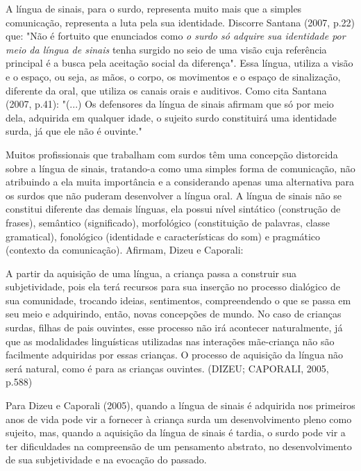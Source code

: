 \documentclass[brasil]{abnt}
\begin{document}
		A língua de sinais, para o surdo, representa muito mais que a 
		simples comunicação, representa a luta pela sua identidade. 
		Discorre Santana (2007, p.22) que: "Não é fortuito que enunciados como 
		\textit{o surdo só adquire sua identidade por meio da língua de sinais} tenha surgido no seio de uma visão cuja referência principal é a busca pela aceitação social da diferença". Essa língua, 
		utiliza a visão e o espaço, ou seja, as mãos, o corpo, os 
		movimentos e o espaço de sinalização, diferente da oral, que 
		utiliza os canais orais e auditivos. Como cita Santana (2007, 
		p.41): "(...) Os 
		defensores da língua de sinais afirmam que só por meio dela, adquirida em qualquer idade, o sujeito surdo constituirá uma identidade surda, já que ele não é ouvinte."
			
		Muitos profissionais que trabalham com surdos têm uma concepção distorcida sobre a língua de sinais, tratando-a como uma simples forma de comunicação, não atribuindo a ela muita importância e a 
		considerando apenas uma alternativa para os surdos que não puderam desenvolver a língua oral. A língua de sinais não se constitui diferente das demais línguas, ela possui nível sintático 
		(construção de frases), semântico (significado), morfológico (constituição de palavras, classe gramatical), fonológico (identidade e características do som) e pragmático (contexto da comunicação). 
		Afirmam, Dizeu e Caporali:
			
				\begin{citacao}A partir da aquisição de uma língua, a criança passa a construir sua subjetividade, pois ela terá recursos para sua inserção no processo dialógico de sua comunidade, trocando 
								ideias, sentimentos, compreendendo o que se passa em seu meio e adquirindo, então, novas concepções de mundo. No caso de crianças surdas, filhas de pais ouvintes, esse processo 
								não irá acontecer naturalmente, já que as modalidades linguísticas utilizadas nas interações mãe-criança não são facilmente adquiridas por essas crianças. O processo de 
								aquisição da língua não será natural, como é para as crianças ouvintes. (DIZEU; CAPORALI, 2005, p.588)
				\end{citacao}
					
		Para Dizeu e Caporali (2005), quando a língua de sinais é adquirida nos primeiros anos de vida pode vir a fornecer à criança surda um desenvolvimento pleno como sujeito, mas, quando a aquisição da 
		língua de sinais é tardia, o surdo pode vir a ter dificuldades na compreensão de um pensamento abstrato, no desenvolvimento de sua subjetividade e na evocação do passado.
					
\end{document}
